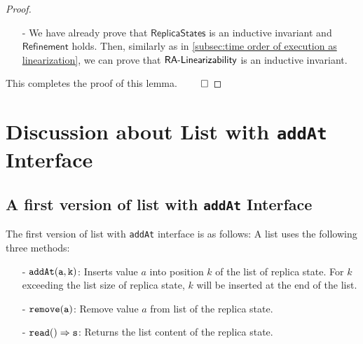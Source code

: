 \begin {proof}
\begin{itemize}
\begin{itemize}
    \item[-] Assume we do $\alabellong[{\tt read}]{}{s}{}$ on replica state $\sigma$. Assume $\sigma = \{w_1,\ldots,w_n\}$, and for each $i$, $w_i = (v_i,tid_i,gv_i)$. Then, $s$ is obtained by walking $\sigma$ and read value of each T-characters according to the T-identifier order $<_t$ of $\sigma$, and ignoring all $nil$. Assume $\refmap(\sigma) = (l,T)$. We can see that $l$ is obtained by walking $\sigma$ and read ghost value of each T-characters according to the T-identifier order $<_t$ of $\sigma$, and $T = \{ gv_i \vert v_i = nil \}$. Thus, we have $\refmap(\sigma) \specarrow{\alabellong[{\tt read}]{}{s}{}} \refmap(\sigma)$.
    \end{itemize}

\item[-] We have already prove that $\mathsf{ReplicaStates}$ is an inductive invariant and $\mathsf{Refinement}$ holds. Then, similarly as in \sectionautorefname \ref{subsec:time order of execution as linearization}, we can prove that $\mathsf{RA\text{-}Linearizability{}}$ is an inductive invariant.
\end{itemize}

This completes the proof of this lemma. $\qed$
\end {proof}











\section{Discussion about List with {\tt addAt} Interface}
\label{sec:discussion about list with addAt interface}



\subsection{A first version of list with {\tt addAt} Interface}
\label{subsec:a first version of list with addAt interface}

The first version of list with {\tt addAt} interface is as follows: A list uses the following three methods:

\begin{itemize}
\setlength{\itemsep}{0.5pt}
\item[-] $\alabelshort[{\tt addAt}]{a,k}$: Inserts value $a$ into position $k$ of the list of replica state. For $k$ exceeding the list size of replica state, $k$ will be inserted at the end of the list.

\item[-] $\alabelshort[{\tt remove}]{a}$: Remove value $a$ from list of the replica state.

\item[-] $\alabellong[{\tt read}]{}{s}{}$: Returns the list content of the replica state.
\end{itemize}

